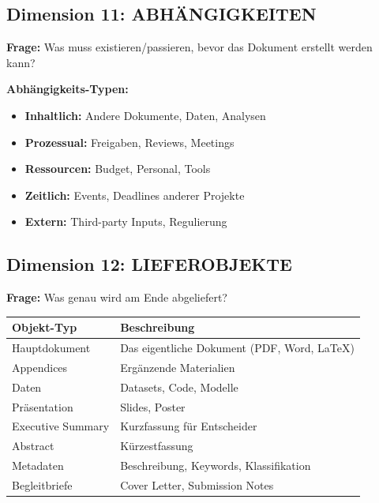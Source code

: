 \documentclass[12pt,a4paper]{article}
\begin{document}
\subsection{Dimension 11: ABHÄNGIGKEITEN}

\textbf{Frage:} Was muss existieren/passieren, bevor das Dokument erstellt werden kann?

\begin{tcolorbox}[colback=yellow!5!white, colframe=yellow!75!black]
\textbf{Abhängigkeits-Typen:}
\begin{itemize}[nosep]
\item \textbf{Inhaltlich:} Andere Dokumente, Daten, Analysen
\item \textbf{Prozessual:} Freigaben, Reviews, Meetings
\item \textbf{Ressourcen:} Budget, Personal, Tools
\item \textbf{Zeitlich:} Events, Deadlines anderer Projekte
\item \textbf{Extern:} Third-party Inputs, Regulierung
\end{itemize}
\end{tcolorbox}

\subsection{Dimension 12: LIEFEROBJEKTE}

\textbf{Frage:} Was genau wird am Ende abgeliefert?

\begin{table}[htbp]
\centering
\renewcommand{\arraystretch}{1.3}
\begin{tabular}{@{}lp{8cm}@{}}
\toprule
\textbf{Objekt-Typ} & \textbf{Beschreibung} \\
\midrule
Hauptdokument & Das eigentliche Dokument (PDF, Word, LaTeX) \\
Appendices & Ergänzende Materialien \\
Daten & Datasets, Code, Modelle \\
Präsentation & Slides, Poster \\
Executive Summary & Kurzfassung für Entscheider \\
Abstract & Kürzestfassung \\
Metadaten & Beschreibung, Keywords, Klassifikation \\
Begleitbriefe & Cover Letter, Submission Notes \\
\bottomrule
\end{tabular}
\end{table}
\end{document}
